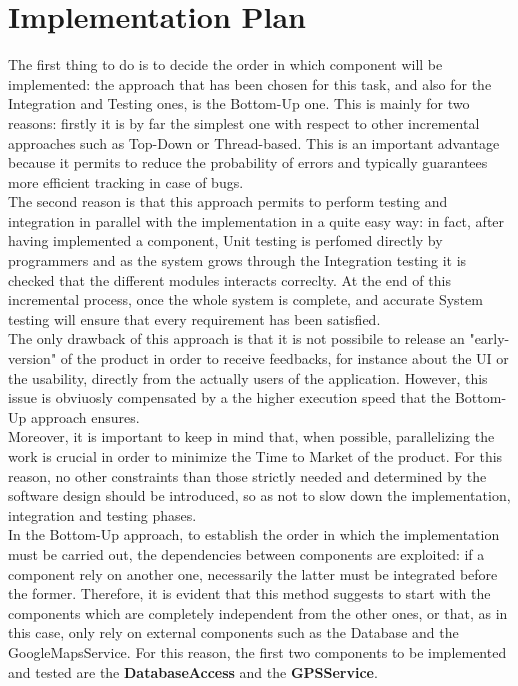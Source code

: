 \section{Implementation Plan}
The first thing to do is to decide the order in which component will be implemented: the approach that has been chosen for this task, and also for the Integration and Testing ones, is the Bottom-Up one. This is mainly for two reasons: firstly it is by far the simplest one with respect to other incremental approaches such as Top-Down or Thread-based. This is an important advantage because it permits to reduce the probability of errors and typically guarantees more efficient tracking in case of bugs. \\
The second reason is that this approach permits to perform testing and integration in parallel with the implementation in a quite easy way: in fact, after having implemented a component, Unit testing is perfomed directly by programmers and as the system grows through the Integration testing it is checked that the different modules interacts correclty. At the end of this incremental process, once the whole system is complete, and accurate System testing will ensure that every requirement has been satisfied.  \\
The only drawback of this approach is that it is not possibile to release an "early-version" of the product in order to receive feedbacks, for instance about the UI or the usability, directly from the actually users of the application. However, this issue is obviuosly compensated by a the higher execution speed that the Bottom-Up approach ensures. \\
Moreover, it is important to keep in mind that, when possible, parallelizing the work is crucial in order to minimize the Time to Market of the product. For this reason, no other constraints than those strictly needed and determined by the software design should be introduced, so as not to slow down the implementation, integration and testing phases. \\  
In the Bottom-Up approach, to establish the order in which the implementation must be carried out, the dependencies between components are exploited: if a component rely on another one, necessarily the latter must be integrated before the former. Therefore, it is evident that this method suggests to start with the components which are completely independent from the other ones, or that, as in this case, only rely on external components such as the Database and the GoogleMapsService.
For this reason, the first two components to be implemented and tested are the \textbf{DatabaseAccess} and the \textbf{GPSService}. \\
